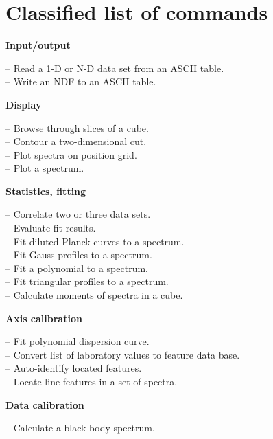 
\newpage
\section{\label{classif}Classified list of commands}

{\bf Input/output}

 -- Read a 1-D or N-D data set from an ASCII table.\\
 -- Write an NDF to an ASCII table.

{\bf Display}

 -- Browse through slices of a cube.\\
 -- Contour a two-dimensional cut.\\
 -- Plot spectra on position grid.\\
 -- Plot a spectrum.

{\bf Statistics, fitting}

 -- Correlate two or three data sets.\\
 -- Evaluate fit results.\\
 -- Fit diluted Planck curves to a spectrum.\\
 -- Fit Gauss profiles to a spectrum.\\
 -- Fit a polynomial to a spectrum.\\
 -- Fit triangular profiles to a spectrum.\\
 -- Calculate moments of spectra in a cube.

{\bf Axis calibration}

 -- Fit polynomial dispersion curve.\\
 -- Convert list of laboratory values to feature data base.\\
 -- Auto-identify located features.\\
 -- Locate line features in a set of spectra.

{\bf Data calibration}

 -- Calculate a black body spectrum.

